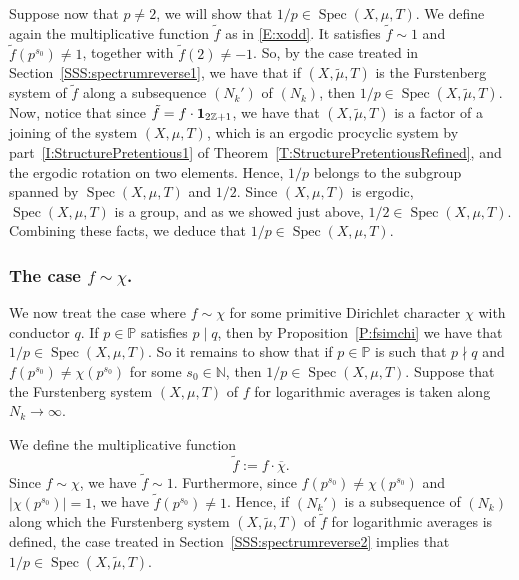 \documentclass[11pt]{amsart}
\theoremstyle{definition}
\newcommand{\N}{{\mathbb N}}
\renewcommand{\P}{{\mathbb P}}
\newcommand{\Z}{{\mathbb Z}}
\DeclareMathOperator{\spec}{Spec}
\begin{document}
Suppose now that  $p\neq 2$, we will show that $1/p\in \spec(X,\mu,T)$. We define again the multiplicative function
$\tilde{f}$ as in \eqref{E:xodd}. It satisfies $\tilde{f}\sim 1$ and  $\tilde{f}(p^{s_0})\neq 1$, together with $\tilde{f}(2)\neq -1$. So, by the  case treated in Section~\ref{SSS:spectrumreverse1}, we have that if $(X,\tilde{\mu},T)$ is the Furstenberg system of $\tilde{f}$ along a subsequence $(N_k')$ of $(N_k)$, then $1/p\in \spec(X,\tilde{\mu},T)$. Now, notice that
since $\tilde{f}=f\cdot {\bf 1}_{2\Z+1}$, we have that
$(X,\tilde{\mu},T)$ is a factor of a joining of the system $(X,\mu,T)$, which is an ergodic procyclic system by part~\eqref{I:StructurePretentious1} of Theorem~\ref{T:StructurePretentiousRefined}, and the ergodic rotation
on two elements. Hence, $1/p$ belongs to the subgroup spanned by $\spec(X,\mu,T)$ and $1/2$. Since $(X,\mu,T)$ is ergodic,
 $\spec(X,\mu,T)$ is a group, and as we showed just above, $1/2\in \spec(X,\mu,T)$. Combining these facts, we deduce  that $1/p\in \spec(X,\mu,T)$.


\subsubsection{The case  $f\sim \chi$.}\label{SSS:spectrumreverse3}
   We now treat the  case where   $f\sim \chi$ for some primitive Dirichlet character $\chi$ with conductor $q$.  If $p\in \P$ satisfies $p\mid q$, then by  Proposition~\ref{P:fsimchi} we have that $1/p\in \spec(X,
\mu,T)$. So it remains to show that if  $p\in \P$ is such that $p\nmid q$ and 
$f(p^{s_0})\neq \chi(p^{s_0})$ for some $s_0\in \N$, then  $1/p\in \spec(X,\mu,T)$. Suppose that the Furstenberg system  $(X,\mu,T)$  of $f$ for logarithmic averages is taken along $N_k\to\infty$.


We define the multiplicative function
 $$
\tilde{f}:=f\cdot \overline{\chi}.
$$
 Since  $f\sim \chi$, we have $\tilde{f}\sim 1$. Furthermore, since
$f(p^{s_0})\neq \chi(p^{s_0})$ and $|\chi(p^{s_0})|=1$,  we have $\tilde{f}(p^{s_0})\neq 1$.
Hence, if $(N_k')$ is a subsequence of $(N_k)$ along which the Furstenberg system $(X,\tilde{\mu},T)$ of $\tilde{f}$ for logarithmic averages is defined,  the case treated in Section~\ref{SSS:spectrumreverse2} implies that $1/p\in \spec(X,\tilde{\mu},T)$.
\end{document}
